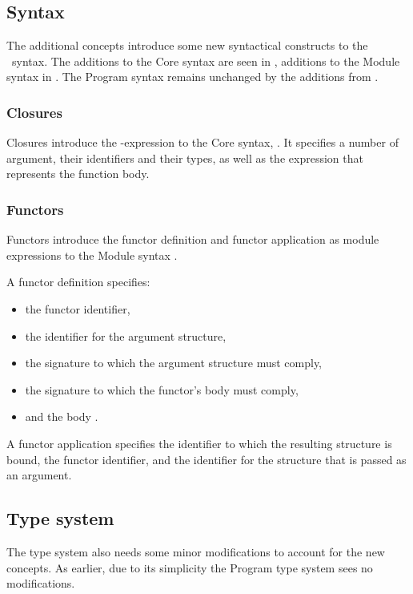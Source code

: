 \subsection{Syntax}
The additional concepts introduce some new syntactical constructs to the \MiniML\ syntax.
The additions to the Core syntax are seen in , additions to the Module syntax in .
The Program syntax remains unchanged by the additions from .

\subsubsection{Closures}
Closures introduce the \cmath{\lambda}-expression to the Core syntax, .
It specifies a number of argument, their identifiers and their types, as well as the expression that represents the function body.


\vspace{-1em} %
\subsubsection{Functors}
Functors introduce the functor definition and functor application as module expressions to the Module syntax .

A functor definition specifies:
\begin{itemize}
\item the functor identifier,
\item the identifier  for the argument structure,
\item the signature  to which the argument structure must comply,
\item the signature  to which the functor's body must comply,
\item and the body .
\end{itemize}
A functor application specifies the identifier to which the resulting structure is bound, the functor identifier, and the identifier for the structure that is passed as an argument.


\subsection{Type system}
The type system also needs some minor modifications to account for the new concepts.
As earlier, due to its simplicity the Program type system sees no modifications.


